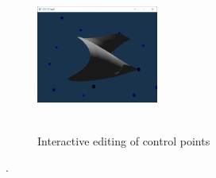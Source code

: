 \documentclass[acmtog]{acmart}
\begin{document}
\begin{figure}[h]
	\includegraphics[width=4cm,height=5cm]{inter5}
	\caption{Interactive editing of control points}
\end{figure}

.
\\
\end{document}
